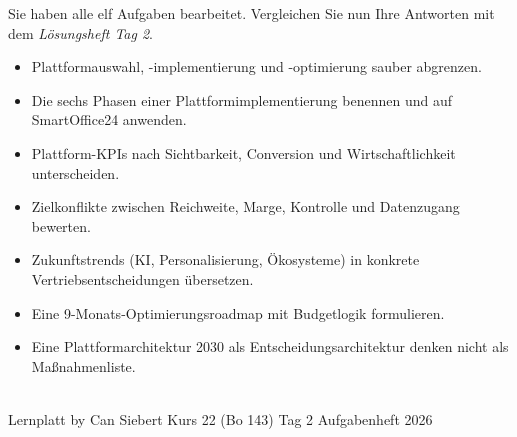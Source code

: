 \documentclass[11pt,a4paper,oneside]{article}
\begin{document}
\noindent Sie haben alle elf Aufgaben bearbeitet. Vergleichen Sie nun Ihre Antworten mit dem \emph{Lösungsheft Tag 2}.

\medskip
\begin{infobox}
\begin{itemize}
  \item Plattformauswahl, -implementierung und -optimierung sauber abgrenzen.
  \item Die sechs Phasen einer Plattformimplementierung benennen und auf SmartOffice24 anwenden.
  \item Plattform-KPIs nach Sichtbarkeit, Conversion und Wirtschaftlichkeit unterscheiden.
  \item Zielkonflikte zwischen Reichweite, Marge, Kontrolle und Datenzugang bewerten.
  \item Zukunftstrends (KI, Personalisierung, Ökosysteme) in konkrete Vertriebsentscheidungen übersetzen.
  \item Eine 9-Monats-Optimierungsroadmap mit Budgetlogik formulieren.
  \item Eine Plattformarchitektur 2030 als Entscheidungsarchitektur denken \textendash{} nicht als Maßnahmenliste.
\end{itemize}
\end{infobox}

\vspace{1cm}
\noindent{\color{lpAccent}\rule{\linewidth}{0.6pt}}\\[4pt]
{\footnotesize\sffamily\color{lpGray}Lernplatt \textperiodcentered{} by Can Siebert \textperiodcentered{} Kurs 22 (Bo 143) \textperiodcentered{} Tag 2 \textperiodcentered{} Aufgabenheft \textperiodcentered{} \textcopyright{} 2026}
\end{document}
